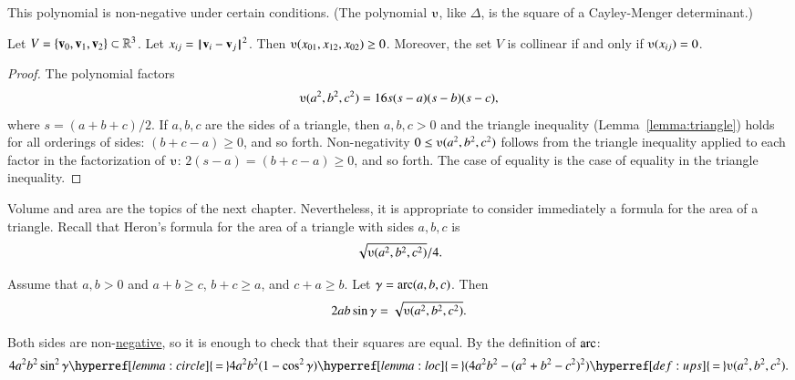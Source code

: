 This polynomial is non-negative under certain conditions. (The polynomial
$\ups$, like $\Delta$, 
is the square of a Cayley-Menger determinant.)  


\begin{lemma}  \label{lemma:ups}
Let $V=\{{\mathbf v}_0,{\mathbf v}_1,{\mathbf v}_2\}\subset\mathbb{R}^3$.  Let $x_{ij} = {\hskip0.1em|\hskip-0.15em|\hskip0.1em}{\mathbf v}_i - {\mathbf v}_j{\hskip0.1em|\hskip-0.15em|\hskip0.1em}^2$.
Then $\ups(x_{01},x_{12},x_{02})\ge 0$.  Moreover, the set $V$ is collinear
 if and only if
$\ups(x_{ij}) = 0$.
\end{lemma}

\begin{proof}
The polynomial factors
    \begin{displaymath}\ups(a^2,b^2,c^2) = 16 s (s-a) (s-b) (s-c),\end{displaymath}
where $s = (a+b+c)/2$.
If $a,b,c$ are the sides of a triangle, then $a,b,c>0$ and the 
triangle inequality (Lemma~\ref{lemma:triangle}) holds for all orderings of sides: $(b+c-a)\ge 0$, and so forth.
Non-negativity $0\le
\ups(a^2,b^2,c^2)$ follows from the triangle inequality applied to
each factor in the factorization of $\ups$: $2(s-a) = (b+c-a) \ge0$, and
so forth.  The case of equality is the case of equality in the triangle inequality.
%
%
\end{proof}


%
Volume and area are the topics of the next chapter.  Nevertheless, it is appropriate
to consider immediately a formula for the area of a triangle.
Recall that Heron's formula for the area of 
a triangle with sides $a,b,c$ is \begin{displaymath}\sqrt{\ups(a^2,b^2,c^2)}/4.\end{displaymath}  

\begin{lemma}\label{lemma:los}
Assume that $a,b>0$ and $a+b\ge c$, $b+c\ge a$, and $c+a\ge b$.
Let $\gamma=\operatorname{arc}(a,b,c)$.  Then
        \begin{displaymath}2 a b \sin\gamma = \sqrt{\ups(a^2,b^2,c^2)}.\end{displaymath}
\end{lemma}
%
%
%
\begin{proved}
Both sides are non-\hyperref[lemma:sin-pos]{negative}, so it is enough to check
that their squares are equal.  By the definition of $\operatorname{arc}$:
      \begin{displaymath}
     4 a^2 b^2 \sin^2\gamma 
    \hyperref[lemma:circle]{\,=\,} 4 a^2 b^2 (1-\cos^2\gamma) 
    \hyperref[lemma:loc]{\,=\,} (4 a^2 b^2 - (a^2 + b^2 -
      c^2)^2) 
    \hyperref[def:ups]{\,=\,} \ups(a^2,b^2,c^2).\end{displaymath}
\swallowed\end{proved}

